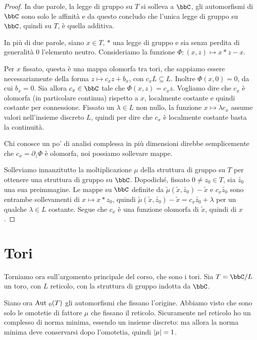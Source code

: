 	\begin{proof}
		In due parole, la legge di gruppo su $T$ si solleva a $\bbC$, gli automorfismi di $\bbC$ sono solo le affinità e da questo concludo che l'unica legge di gruppo su $\bbC$, quindi su $T$, è quella additiva.

		In più di due parole, siano $x \in T$, $*$ una legge di gruppo e sia senza perdita di generalità $0$ l'elemento neutro. Consideriamo la funzione $\Phi: (x, z) \mapsto x * z - x$.

		Per $x$ fissato, questa è una mappa olomorfa tra tori, che sappiamo essere necessariamente della forma $z \mapsto c_x z + b_x$, con $c_x L \subseteq L$. Inoltre $\Phi(x, 0) = 0$, da cui $b_x = 0$. Sia allora $c_x \in \bbC$ tale che $\Phi(x, z) = c_x z$.
		Vogliamo dire che $c_x$ è olomorfa (in particolare continua) rispetto a $x$, localmente costante e quindi costante per connessione.
		Fissato un $\lambda \in L$ non nullo, la funzione $x \mapsto \lambda c_x$ assume valori nell'insieme discreto $L$, quindi per dire che $c_x$ è localmente costante basta la continuità.
		
		Chi conosce un po' di analisi complessa in più dimensioni direbbe semplicemente che $c_x = \partial_z \Phi$ è olomorfa, noi possiamo sollevare mappe.

		Solleviamo innanzitutto la moltiplicazione $\mu$ della struttura di gruppo su $T$ per ottenere una struttura di gruppo su $\bbC$. Dopodiché, fissato $0 \ne z_0 \in T$, sia $\tilde{z_0}$ una sua preimmagine. Le mappe su $\bbC$ definite da $\tilde{\mu}(\tilde{x}, \tilde{z_0}) - \tilde{x}$ e $c_x \tilde{z_0}$ sono entrambe sollevamenti di $x \mapsto x * z_0$, quindi $\tilde{\mu}(\tilde{x}, \tilde{z_0}) - \tilde{x} = c_x \tilde{z_0} + \lambda$ per un qualche $\lambda \in L$ costante.
		Segue che $c_x$ è una funzione olomorfa di $\tilde{x}$, quindi di $x$.
	\end{proof}

	
	\section{Tori}
	
	Torniamo ora sull'argomento principale del corso, che sono i tori. Sia $T = \bbC / L$ un toro, con $L$ reticolo, con la struttura di gruppo indotta da $\bbC$.
	
	Siano ora $\text{Aut }_0(T)$ gli automorfismi che fissano l'origine. Abbiamo visto che sono solo le omotetie di fattore $\mu$ che fissano il reticolo. Sicuramente nel reticolo ho un complesso di norma minima, essendo un insieme discreto: ma allora la norma minima deve conservarsi dopo l'omotetia, quindi $\left| \mu \right|=1$.
	
